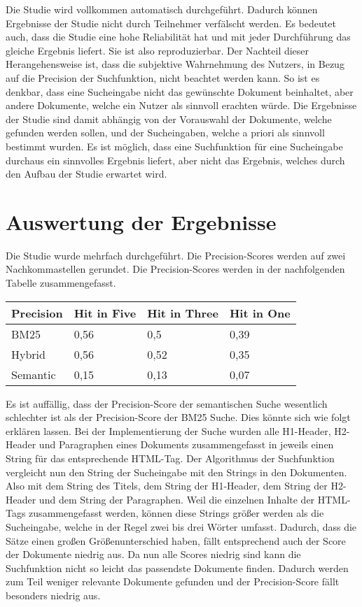 Die Studie wird vollkommen automatisch durchgeführt.
Dadurch können Ergebnisse der Studie nicht durch Teilnehmer verfälscht werden.
Es bedeutet auch, dass die Studie eine hohe Reliabilität hat und mit jeder Durchführung das gleiche Ergebnis liefert.
Sie ist also reproduzierbar.
Der Nachteil dieser Herangehensweise ist, dass die subjektive Wahrnehmung des Nutzers, in Bezug auf die Precision der Suchfunktion, nicht beachtet werden kann.
So ist es denkbar, dass eine Sucheingabe nicht das gewünschte Dokument beinhaltet, aber andere Dokumente, welche ein Nutzer als sinnvoll erachten würde.
Die Ergebnisse der Studie sind damit abhängig von der Vorauswahl der Dokumente, welche gefunden werden sollen, und der Sucheingaben, welche a priori als sinnvoll bestimmt wurden.
Es ist möglich, dass eine Suchfunktion für eine Sucheingabe durchaus ein sinnvolles Ergebnis liefert, aber nicht das Ergebnis, welches durch den Aufbau der Studie erwartet wird.

\section{Auswertung der Ergebnisse}
Die Studie wurde mehrfach durchgeführt.
Die Precision-Scores werden auf zwei Nachkommastellen gerundet.
Die Precision-Scores werden in der nachfolgenden Tabelle zusammengefasst.

\begin{table}[!ht]
    \centering
    \begin{tabular}{|l|l|l|l|}
    \hline
        Precision & Hit in Five & Hit in Three & Hit in One \\ \hline
        BM25 & 0,56 & 0,5 & 0,39 \\ \hline
        Hybrid & 0,56 & 0,52 & 0,35 \\ \hline
        Semantic & 0,15 & 0,13 & 0,07 \\ \hline
    \end{tabular}
\end{table}

Es ist auffällig, dass der Precision-Score der semantischen Suche wesentlich schlechter ist als der Precision-Score der BM25 Suche.
Dies könnte sich wie folgt erklären lassen.
Bei der Implementierung der Suche wurden alle H1-Header, H2-Header und Paragraphen eines Dokuments zusammengefasst in jeweils einen String für das entsprechende HTML-Tag.
Der Algorithmus der Suchfunktion vergleicht nun den String der Sucheingabe mit den Strings in den Dokumenten.
Also mit dem String des Titels, dem String der H1-Header, dem String der H2-Header und dem String der Paragraphen.
Weil die einzelnen Inhalte der HTML-Tags zusammengefasst werden, können diese Strings größer werden als die Sucheingabe, welche in der Regel zwei bis drei Wörter umfasst.
Dadurch, dass die Sätze einen großen Größenunterschied haben, fällt entsprechend auch der Score der Dokumente niedrig aus.
Da nun alle Scores niedrig sind kann die Suchfunktion nicht so leicht das passendste Dokumente finden.
Dadurch werden zum Teil weniger relevante Dokumente gefunden und der Precision-Score fällt besonders niedrig aus.\\

